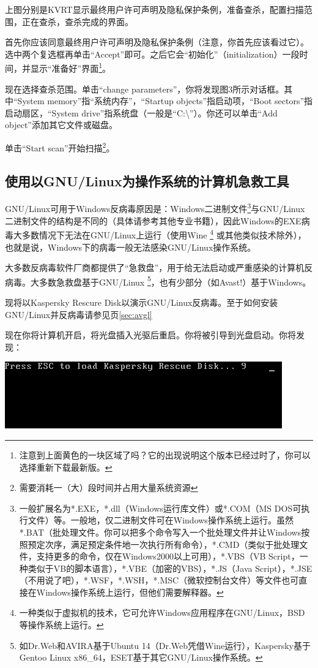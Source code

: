 \documentclass{book}
\begin{document}
上图分别是KVRT显示最终用户许可声明及隐私保护条例，准备查杀，配置扫描范围，正在查杀，查杀完成的界面。\par
首先你应该同意最终用户许可声明及隐私保护条例（注意，你首先应该看过它）。选中两个复选框再单击“Accept”即可。之后它会“初始化”（initialization）一段时间，并显示“准备好”界面\footnote{注意到上面黄色的一块区域了吗？它的出现说明这个版本已经过时了，你可以选择重新下载最新版。}。\par
现在选择查杀范围。单击“change parameters”，你将发现图3所示对话框。其中“System memory”指“系统内存”，“Startup objects”指启动项，“Boot sectors”指启动扇区，“System drive”指系统盘（一般是“C:\textbackslash”）。你还可以单击“Add object”添加其它文件或磁盘。\par
单击“Start scan”开始扫描\footnote{需要消耗一（大）段时间并占用大量系统资源}。
\subsection{使用以GNU/Linux为操作系统的计算机急救工具}
GNU/Linux可用于Windows反病毒原因是：Windows二进制文件\footnote{一般扩展名为*.EXE，*.dll（Windows运行库文件）或*.COM（MS DOS可执行文件）等。一般地，仅二进制文件可在Windows操作系统上运行。虽然*.BAT（批处理文件。你可以把多个命令写入一个批处理文件并让Windows按照预定次序，满足预定条件地一次执行所有命令），*.CMD（类似于批处理文件，支持更多的命令，仅在Windows2000以上可用），*.VBS（VB Script，一种类似于VB的脚本语言），*.VBE（加密的VBS），*.JS（Java Script），*.JSE（不用说了吧），*.WSF，*.WSH，*.MSC（微软控制台文件）等文件也可直接在Windows操作系统上运行，但他们需要解释器。}与GNU/Linux二进制文件的结构是不同的（具体请参考其他专业书籍），因此Windows的EXE病毒大多数情况下无法在GNU/Linux上运行（使用Wine \footnote{一种类似于虚拟机的技术，它可允许Windows应用程序在GNU/Linux，BSD等操作系统上运行。} 或其他类似技术除外），也就是说，Windows下的病毒一般无法感染GNU/Linux操作系统。\par
大多数反病毒软件厂商都提供了“急救盘”，用于给无法启动或严重感染的计算机反病毒。大多数急救盘基于GNU/Linux \footnote{如Dr.Web和AVIRA基于Ubuntu 14（Dr.Web凭借Wine运行），Kaspersky基于Gentoo Linux x86\_64，ESET基于其它GNU/Linux操作系统。}，也有少部分（如Avast!）基于Windows。\par
现将以Kaspersky Rescure Disk以演示GNU/Linux反病毒。至于如何安装GNU/Linux并反病毒请参见\pageref{sec:avgl}页\ref{sec:avgl}\par
现在你将计算机开启，将光盘插入光驱后重启。你将被引导到光盘启动。你将发现：
\begin{center}
	\includegraphics[scale=0.7]{pic/krd1}
\end{center}
\end{document}
